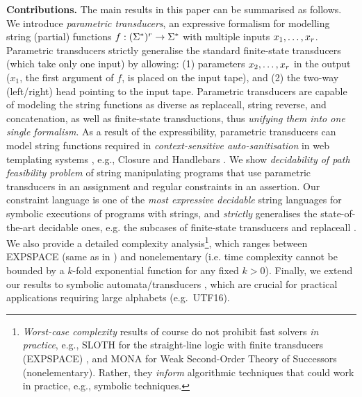 \smallskip
\noindent
\textbf{Contributions.} The main results in this paper can be summarised
as follows. We introduce \emph{parametric 
transducers}, an expressive formalism for modelling string (partial) functions 
$f: (\Sigma^*)^r \to \Sigma^*$ with multiple inputs $x_1,\ldots, x_r$. Parametric
transducers strictly generalise the standard finite-state transducers (which take only
one input) by allowing: (1) parameters $x_2,\ldots,x_r$ in the output
($x_1$, the first argument of $f$, is placed on the input tape), 
and (2) the two-way (left/right) head pointing to the input tape. 
Parametric transducers are capable of modeling the string functions as diverse as replaceall, string reverse, and concatenation, as well as finite-state transductions, thus \emph{unifying them into one single formalism}.
As a result of the expressibility, parametric transducers can model string functions required in \emph{context-sensitive
auto-sanitisation} in web templating systems \cite{SSS11}, e.g., Closure 
\cite{Closure} and Handlebars \cite{Handlebars}. 
We show \emph{decidability of path 
feasibility problem} of string manipulating programs that use parametric transducers in an 
assignment and regular constraints in an assertion. Our constraint language
is one of the \emph{most expressive decidable} string languages for symbolic executions
of programs with strings, and \emph{strictly} generalises 
the state-of-the-art decidable ones, e.g. 
the subcases of finite-state transducers \cite{LB16}
and replaceall \cite{CCHLW18}. We also provide a detailed complexity 
analysis\footnote{
\emph{Worst-case complexity} results of course do not prohibit fast solvers 
\emph{in practice}, e.g., SLOTH for the straight-line 
logic with finite transducers (EXPSPACE) 
\cite{HJLRV18}, and MONA for Weak Second-Order
Theory of Successors (nonelementary). Rather, they
\emph{inform} algorithmic techniques that could work in practice, e.g., 
symbolic techniques.},
which ranges between EXPSPACE (same as in \cite{LB16,CCHLW18}) and
nonelementary (i.e. time complexity cannot be bounded by a $k$-fold exponential
function for any fixed $k > 0$). 
Finally, we extend our results to symbolic automata/transducers
\cite{BEK,symbolic-transducer,DV13,symbolic-transducer-power}, which are crucial for practical 
applications requiring large alphabets (e.g.~UTF16).


